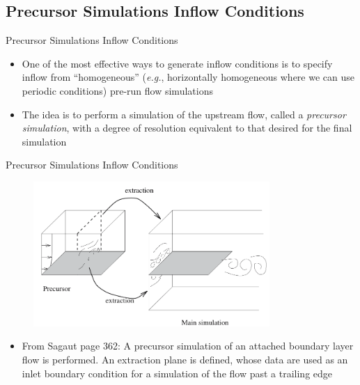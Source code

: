 \subsection{Precursor Simulations Inflow Conditions}
\begin{frame}{Precursor Simulations Inflow Conditions}
	\begin{itemize}
	\item One of the most effective ways to generate inflow conditions is to specify inflow from ``homogeneous'' (\textit{e.g.}, horizontally homogeneous where we can use periodic conditions) pre-run flow simulations
	\item The idea is to perform a simulation of the upstream flow, called a \textit{precursor simulation}, with a degree of resolution equivalent to that desired for the final simulation
	\end{itemize}
\end{frame}
\begin{frame}{Precursor Simulations Inflow Conditions}
	\begin{figure}
		\includegraphics[width=0.8\textwidth]{inlet3}
	\end{figure}
	\begin{itemize}
	\item From Sagaut page 362: A precursor simulation of an attached boundary layer flow is performed. An extraction plane is defined, whose data are used as an inlet boundary condition for a simulation of the flow past a trailing edge
	\end{itemize}
\end{frame}
